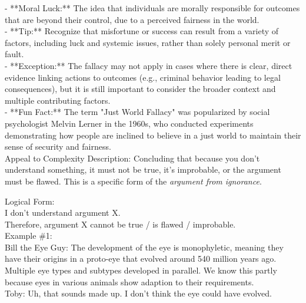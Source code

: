 \documentclass[a4paper,12pt,single,pdftex]{scrbook}
\begin{document}
    
        - **Moral Luck:** The idea that individuals are morally responsible for outcomes that are beyond their control, due to a perceived fairness in the world.
    \\

    
      - **Tip:** Recognize that misfortune or success can result from a variety of factors, including luck and systemic issues, rather than solely personal merit or fault.
    \\

    
      - **Exception:** The fallacy may not apply in cases where there is clear, direct evidence linking actions to outcomes (e.g., criminal behavior leading to legal consequences), but it is still important to consider the broader context and multiple contributing factors.
    \\

    
      - **Fun Fact:** The term "Just World Fallacy" was popularized by social psychologist Melvin Lerner in the 1960s, who conducted experiments demonstrating how people are inclined to believe in a just world to maintain their sense of security and fairness.
    \\

  

Appeal to Complexity
    Description: Concluding that because you don't understand something, it must not be true, it's improbable, or the argument must be flawed. This is a specific form of the {\it argument from ignorance}.

    
      Logical Form:
    \\

    
      I don't understand argument X.
    \\

    
      Therefore, argument X cannot be true / is flawed / improbable.
    \\

    
      Example \#1:
    \\

    
      Bill the Eye Guy: The development of the eye is monophyletic, meaning they have their origins in a proto-eye that evolved around 540 million years ago. Multiple eye types and subtypes developed in parallel. We know this partly because eyes in various animals show adaption to their requirements.
    \\

    
      Toby: Uh, that sounds made up. I don't think the eye could have evolved.
    \\
\end{document}
